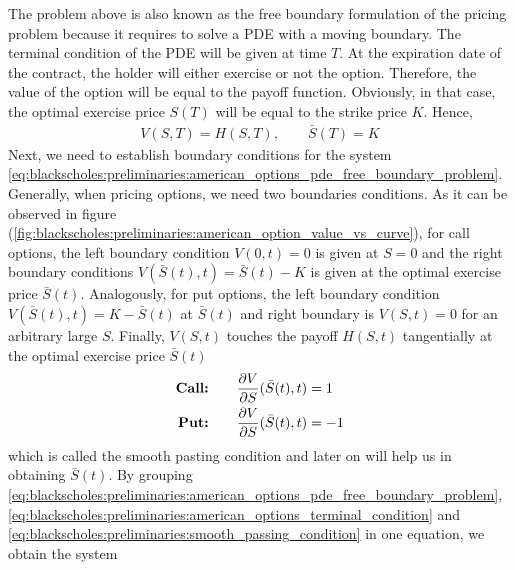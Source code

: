 The problem above is also known as the free boundary formulation of the pricing problem because it requires to solve a PDE with a moving boundary. The terminal
condition of the PDE will be given at time $T$. At the expiration date of the contract, the holder will either exercise or not the option. Therefore, the value of the option will be equal to the payoff function. Obviously, in that case, the optimal exercise price $S(T)$ will be equal to the strike price $K$. Hence,
\begin{align}
  V(S,T) = H(S, T), \qquad \bar{S}(T) = K
  \label{eq:blackscholes:preliminaries:american_options_terminal_condition}
\end{align}
Next, we need to establish boundary conditions for the system
\eqref{eq:blackscholes:preliminaries:american_options_pde_free_boundary_problem}.
Generally, when pricing options, we need two boundaries conditions. 
As it can be observed in figure (\ref{fig:blackscholes:preliminaries:american_option_value_vs_curve}), for call options, the left boundary condition $V(0,t)=0$ is given at $S=0$ and the right boundary conditions $V(\bar{S}(t),t)=\bar{S}(t) - K$ is given at the optimal exercise price $\bar{S}(t)$. Analogously, for put options, the left boundary condition $V(\bar{S}(t),t)=K - \bar{S}(t)$ at $\bar{S}(t)$ and right boundary is $V(S, t)=0$ for an arbitrary large $S$. Finally, $V(S,t)$ touches the payoff $H(S,t)$ tangentially at the optimal exercise price $\bar{S}(t)$
\begin{subequations} \label{eq:blackscholes:preliminaries:smooth_passing_condition}
  \begin{align}
    \text{\textbf{Call:}} \qquad &\dfrac{\partial{V}}{\partial{S}}(\bar{S}(t), t) = 1\\
    \text{\textbf{Put:}} \qquad &\dfrac{\partial{V}}{\partial{S}}(\bar{S}(t), t) = -1
  \end{align}
\end{subequations}
which is called the smooth pasting condition and later on will help us in obtaining $\bar{S}(t)$. By grouping \eqref{eq:blackscholes:preliminaries:american_options_pde_free_boundary_problem}, \eqref{eq:blackscholes:preliminaries:american_options_terminal_condition} and \eqref{eq:blackscholes:preliminaries:smooth_passing_condition} in one equation,
we obtain the system

